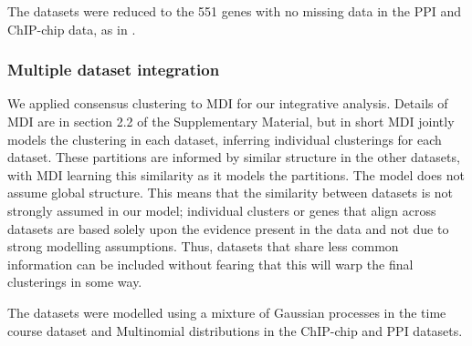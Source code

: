 \documentclass{bmcart}
\begin{document}
The datasets were reduced to the 551 genes with no missing data in the PPI and ChIP-chip data, as in \cite{kirk2012bayesian}. 

\subsubsection*{Multiple dataset integration}
We applied consensus clustering to MDI for our integrative analysis. Details of MDI are in section 2.2 of the Supplementary Material, but in short MDI jointly models the clustering in each dataset, inferring individual clusterings for each dataset. These partitions are informed by similar structure in the other datasets, with MDI learning this similarity as it models the partitions. The model does not assume global structure. This means that the similarity between datasets is not strongly assumed in our model; individual clusters or genes that align across datasets are based solely upon the evidence present in the data and not due to strong modelling assumptions. Thus, datasets that share less common information can be included without fearing that this will warp the final clusterings in some way.

The datasets were modelled using a mixture of Gaussian processes in the time course dataset and Multinomial distributions in the ChIP-chip and PPI datasets.
\end{document}
